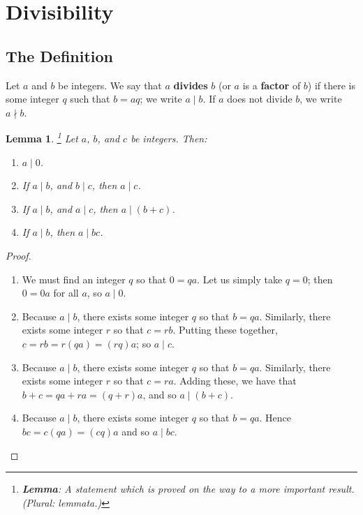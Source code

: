 \documentclass[a4paper,leqno]{article}
\numberwithin{equation}{section}
\newtheorem{lem}[equation]{Lemma}
\theoremstyle{definition}
\theoremstyle{remark}
\newcommand{\df}[1]{\textbf{#1}}
\begin{document}
\section{Divisibility}
\subsection{The Definition}
Let $ a $ and $ b $ be integers. We say that $ a $ \df{divides} $ b $ (or $ a $ is a \df{factor} of $ b $) if there is some integer $ q $ such
that $ b = aq $; we write $ a \mid b $. If $ a $ does not divide $ b $, we write $ a \nmid b $.
\begin{lem}\footnote{\df{Lemma}: A statement which is proved on the way to a more important result. (Plural: lemmata.)}\leavevmode
  Let $ a $, $ b $, and $ c $ be integers. Then:
  \begin{enumerate}
    \item $ a \mid 0 $.
    \item If $ a \mid b $, and $ b \mid c $, then $ a \mid c $.
    \item If $ a \mid b $, and $ a \mid c $, then $ a \mid (b + c) $.
    \item If $ a \mid b $, then $ a \mid bc $.
  \end{enumerate}
\end{lem}
\begin{proof}\leavevmode
  \begin{enumerate}
    \item We must find an integer $ q $ so that $ 0 = qa $. Let us simply take $ q = 0 $; then $ 0 = 0a $ for all $ a $, so $ a \mid 0 $.
    \item Because $ a \mid b $, there exists some integer $ q $ so that $ b = qa $. Similarly, there exists some integer $ r $ so that $ c = rb $.
          Putting these together, $ c = rb = r(qa) = (rq)a $; so $ a \mid c $.
    \item Because $ a \mid b $, there exists some integer $ q $ so that $ b = qa $. Similarly, there exists some integer $ r $ so that $ c = ra $.
          Adding these, we have that $ b + c = qa + ra = (q + r)a $, and so $ a \mid (b+c) $.
    \item Because $ a \mid b $, there exists some integer $ q $ so that $ b = qa $. Hence $ bc = c(qa) = (cq)a $ and so $ a \mid bc $.
  \end{enumerate}
\end{proof}
\end{document}
